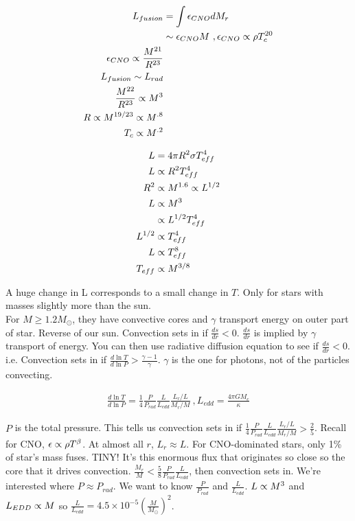 \begin{align}
L_{fusion}&  = \int \epsilon_{CNO} dM_r\\
 & \sim \epsilon_{CNO}M~, \epsilon_{CNO} \propto \rho T_c^{20}\\
 \epsilon_{CNO} \propto \frac{M^{21}}{R^{23}}\\
 L_{fusion} \sim L_{rad}\\
  \frac{M^{22}}{R^{23}} \propto M^3\\
  R \propto M^{19/23} \propto M^{.8}\\
  T_c \propto M^{.2}
\end{align}

\begin{align}
L & = 4 \pi R^2 \sigma T_{eff}^4\\
L & \propto R^2 T_{eff}^4\\
R^2  & \propto M^{1.6} \propto L^{1/2}\\
L & \propto M^3\\
   & \propto L^{1/2}T_{eff}^4\\
L^{1/2} & \propto T_{eff}^4\\
L & \propto T_{eff}^8\\
T_{eff} & \propto M^{3/8}
\end{align}

A huge change in L corresponds to a small change in $T$. Only for stars with masses slightly more than the sun. \\

For $M \geq 1.2 M_\odot$, they have convective cores and $\gamma$ transport energy on outer part of star. Reverse of our sun. Convection sets in if $\frac{ds}{dr} < 0$. $\frac{ds}{dr}$ is implied by $\gamma$ transport of energy. You can then use radiative diffusion equation to see if $\frac{ds}{dr}<0$. i.e. Convection sets in if $\frac{d \ln T}{d \ln P} > \frac{\gamma -1}{\gamma}$. $\gamma$ is the one for photons, not of the particles convecting. 

\begin{align}
\frac{d \ln T}{d \ln P}  = \frac{1}{4} \frac{P}{P_{rad}}\frac{L}{L_{edd}}\frac{L_r/L}{M_r/M}~,L_{edd} = \frac{4 \pi G M_c}{\kappa}
\end{align}

$P$ is the total pressure. This tells us convection sets in if $\frac{1}{4} \frac{P}{P_{rad}}\frac{L}{L_{edd}}\frac{L_r/L}{M_r/M} > \frac{2}{5}$. Recall for CNO, $\epsilon \propto \rho T^\beta$. At almost all $r$, $L_r \approx L$. For CNO-dominated stars, only 1\% of star's mass fuses. TINY! It's this enormous flux that originates so close so the core that it drives convection. $\frac{M_r}{M} < \frac{5}{8} \frac{P}{P_{rad}}\frac{L}{L_{edd}}$, then convection sets in. We're interested where $P \approx P_{rad}$. We want to know $\frac{P}{P_{rad}}$ and $\frac{L}{L_{edd}}$. $L \propto M^3$ and $L_{EDD} \propto M$ so $\frac{L}{L_{edd}} = 4.5 \times 10^{-5} \left( \frac{M}{M_\odot} \right)^2$. \\


